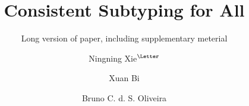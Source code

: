 \documentclass[oribibl,dvipsnames]{llncs}
\begin{document}
\title{Consistent Subtyping for All}
\ifdefined\submitoption
\subtitle{Long version of paper, including supplementary meterial}         %
\fi

\author{Ningning Xie$^{\textrm{\Letter}}$ \and Xuan Bi \and Bruno C. d. S. Oliveira}







\end{document}
